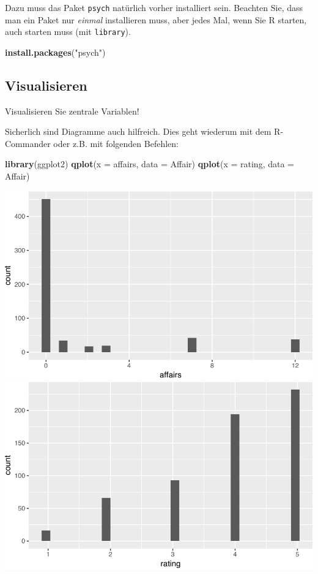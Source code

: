 \documentclass[12pt,ngerman,]{book}
\newenvironment{Shaded}{\begin{snugshade}}{\end{snugshade}}
\newcommand{\KeywordTok}[1]{\textcolor[rgb]{0.13,0.29,0.53}{\textbf{{#1}}}}
\newcommand{\DataTypeTok}[1]{\textcolor[rgb]{0.13,0.29,0.53}{{#1}}}
\newcommand{\StringTok}[1]{\textcolor[rgb]{0.31,0.60,0.02}{{#1}}}
\newcommand{\NormalTok}[1]{{#1}}
\renewenvironment{Shaded}{\begin{kframe}}{\end{kframe}}
\begin{document}
Dazu muss das Paket \texttt{psych} natürlich vorher installiert sein.
Beachten Sie, dass man ein Paket nur \emph{einmal} installieren muss,
aber jedes Mal, wenn Sie R starten, auch starten muss (mit
\texttt{library}).

\begin{Shaded}
\begin{Highlighting}[]
\KeywordTok{install.packages}\NormalTok{(}\StringTok{"psych"}\NormalTok{)}
\end{Highlighting}
\end{Shaded}

\subsection{Visualisieren}\label{visualisieren}

Visualisieren Sie zentrale Variablen!

Sicherlich sind Diagramme auch hilfreich. Dies geht wiederum mit dem
R-Commander oder z.B. mit folgenden Befehlen:

\begin{Shaded}
\begin{Highlighting}[]

\KeywordTok{library}\NormalTok{(ggplot2)}
\KeywordTok{qplot}\NormalTok{(}\DataTypeTok{x =} \NormalTok{affairs, }\DataTypeTok{data =} \NormalTok{Affair)}
\KeywordTok{qplot}\NormalTok{(}\DataTypeTok{x =} \NormalTok{rating, }\DataTypeTok{data =} \NormalTok{Affair)}
\end{Highlighting}
\end{Shaded}

\begin{center}\includegraphics[width=0.7\linewidth]{076_Fallstudie_Affairs_files/figure-latex/unnamed-chunk-8-1} \includegraphics[width=0.7\linewidth]{076_Fallstudie_Affairs_files/figure-latex/unnamed-chunk-8-2} \end{center}
\end{document}
